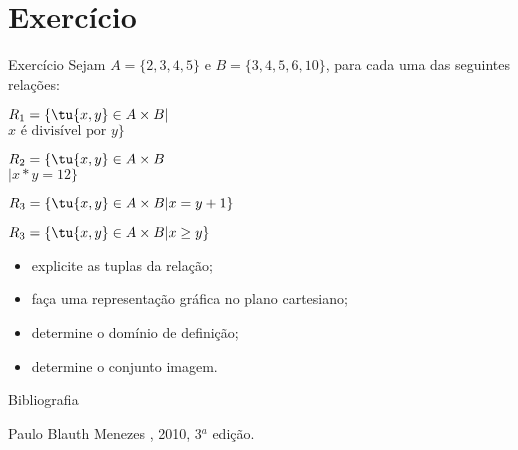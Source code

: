\def\mysection{Exercício}
\section{\mysection}
\begin{frame}{\mysection}
  \small
  Sejam $A=\{2,3,4,5\}$ e $B=\{3,4,5,6,10\}$, para cada uma das
  seguintes relações:
  \begin{enumerate}\footnotesize
    \begin{minipage}[h]{.475\linewidth}
    \item $R_1=\{\tu{x,y}\in A\times B|$\\$x\text{ é divisível por }y\}$\\
    \item $R_2=\{\tu{x,y}\in A\times B$\\$|x*y=12\}$\\
    \end{minipage}
    \begin{minipage}[h]{.45\linewidth}
    \item $R_3=\{\tu{x,y}\in A\times B|x=y+1\}$\\
    \item $R_3=\{\tu{x,y}\in A\times B|x\geq y\}$\\
    \end{minipage}
  \end{enumerate}
  \begin{itemize}
  \item explicite as tuplas da relação;
  \item faça uma representação gráfica no plano cartesiano;
  \item determine o domínio de definição;
  \item determine o conjunto imagem.
  \end{itemize}
\end{frame}

\begin{frame}{Bibliografia}
  \begin{thebibliography}{5}
    {Paulo Blauth Menezes}
    , {2010}, {3$^a$ edi\c{c}\~{a}o}.
  \end{thebibliography}
\end{frame}

